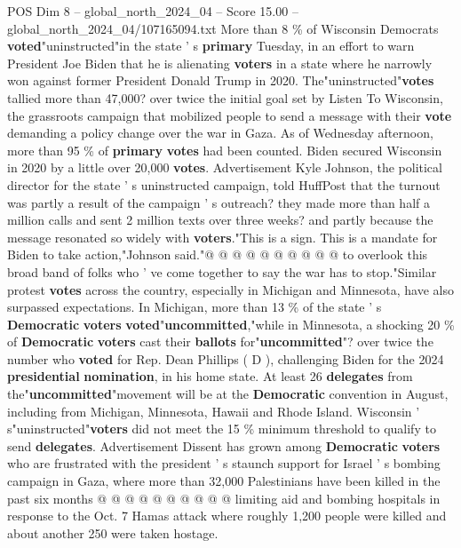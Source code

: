\begin{textsample}{POS Dim 8 – global\_north\_2024\_04 – Score 15.00 – global\_north\_2024\_04/107165094.txt}  \label{ex:f8_pos_053}
More than 8 \% of Wisconsin Democrats \textbf{voted}"uninstructed"in the state ' s \textbf{primary} Tuesday, in an effort to warn President Joe Biden that he is alienating \textbf{voters} in a state where he narrowly won against former President Donald Trump in 2020.
The"uninstructed"\textbf{votes} tallied more than 47,000? over twice the initial goal set by Listen To Wisconsin, the grassroots campaign that mobilized people to send a message with their \textbf{vote} demanding a policy change over the war in Gaza.
As of Wednesday afternoon, more than 95 \% of \textbf{primary} \textbf{votes} had been counted.
Biden secured Wisconsin in 2020 by a little over 20,000 \textbf{votes}.
Advertisement Kyle Johnson, the political director for the state ' s uninstructed campaign, told HuffPost that the turnout was partly a result of the campaign ' s outreach? they made more than half a million calls and sent 2 million texts over three weeks? and partly because the message resonated so widely with \textbf{voters}."This is a sign.
This is a mandate for Biden to take action,"Johnson said."@ @ @ @ @ @ @ @ @ @ to overlook this broad band of folks who ' ve come together to say the war has to stop."Similar protest \textbf{votes} across the country, especially in Michigan and Minnesota, have also surpassed expectations.
In Michigan, more than 13 \% of the state ' s \textbf{Democratic} \textbf{voters} \textbf{voted}"\textbf{uncommitted},"while in Minnesota, a shocking 20 \% of \textbf{Democratic} \textbf{voters} cast their \textbf{ballots} for"\textbf{uncommitted}"? over twice the number who \textbf{voted} for Rep.
Dean Phillips ( D ), challenging Biden for the 2024 \textbf{presidential} \textbf{nomination}, in his home state.
At least 26 \textbf{delegates} from the"\textbf{uncommitted}"movement will be at the \textbf{Democratic} convention in August, including from Michigan, Minnesota, Hawaii and Rhode Island.
Wisconsin ' s"uninstructed"\textbf{voters} did not meet the 15 \% minimum threshold to qualify to send \textbf{delegates}.
Advertisement Dissent has grown among \textbf{Democratic} \textbf{voters} who are frustrated with the president ' s staunch support for Israel ' s bombing campaign in Gaza, where more than 32,000 Palestinians have been killed in the past six months @ @ @ @ @ @ @ @ @ @ limiting aid and bombing hospitals in response to the Oct. 7 Hamas attack where roughly 1,200 people were killed and about another 250 were taken hostage.

\end{textsample}
